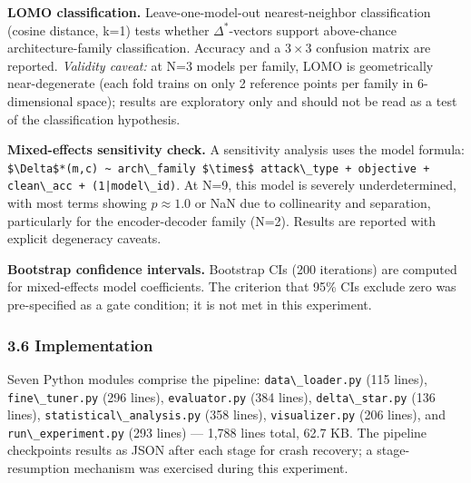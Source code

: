 \textbf{LOMO classification.} Leave-one-model-out nearest-neighbor classification (cosine distance, k=1) tests whether $\Delta^*$-vectors support above-chance architecture-family classification. Accuracy and a $3\times 3$ confusion matrix are reported. \textit{Validity caveat:} at N=3 models per family, LOMO is geometrically near-degenerate (each fold trains on only 2 reference points per family in 6-dimensional space); results are exploratory only and should not be read as a test of the classification hypothesis.

\textbf{Mixed-effects sensitivity check.} A sensitivity analysis uses the model formula: \texttt{\$\textbackslash Delta\$*(m,c) \~{} arch\textbackslash \_family \$\textbackslash times\$ attack\textbackslash \_type + objective + clean\textbackslash \_acc + (1|model\textbackslash \_id)}. At N=9, this model is severely underdetermined, with most terms showing $p\approx 1.0$ or NaN due to collinearity and separation, particularly for the encoder-decoder family (N=2). Results are reported with explicit degeneracy caveats.

\textbf{Bootstrap confidence intervals.} Bootstrap CIs (200 iterations) are computed for mixed-effects model coefficients. The criterion that 95\% CIs exclude zero was pre-specified as a gate condition; it is not met in this experiment.

\subsubsection{3.6 Implementation}

Seven Python modules comprise the pipeline: \texttt{data\textbackslash \_loader.py} (115 lines), \texttt{fine\textbackslash \_tuner.py} (296 lines), \texttt{evaluator.py} (384 lines), \texttt{delta\textbackslash \_star.py} (136 lines), \texttt{statistical\textbackslash \_analysis.py} (358 lines), \texttt{visualizer.py} (206 lines), and \texttt{run\textbackslash \_experiment.py} (293 lines) --- 1,788 lines total, 62.7 KB. The pipeline checkpoints results as JSON after each stage for crash recovery; a stage-resumption mechanism was exercised during this experiment.
